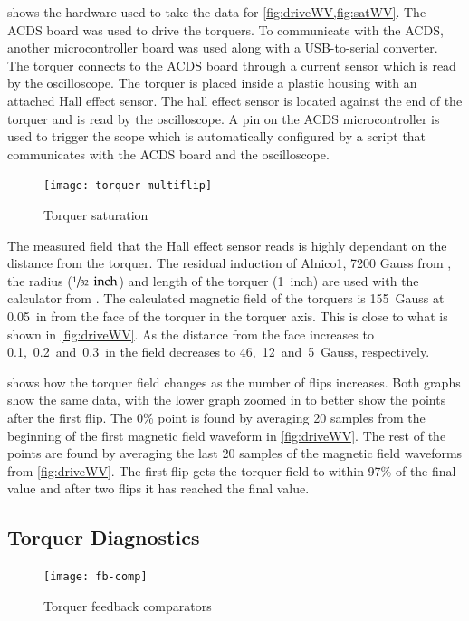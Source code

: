  shows the hardware used to take the data for \cref{fig:driveWV,fig:satWV}. The \ac{ACDS} board was used to drive the torquers. To communicate with the \ac{ACDS}, another microcontroller board was used along with a \ac{USB}-to-serial converter. The torquer connects to the \ac{ACDS} board through a current sensor which is read by the oscilloscope. The torquer is placed inside a plastic housing with an attached Hall effect sensor. The hall effect sensor is located against the end of the torquer and is read by the oscilloscope. A pin on the \ac{ACDS} microcontroller is  used to trigger the scope which is automatically configured by a \matlab script that communicates with the \ac{ACDS} board and the oscilloscope.

\begin{figure}[htb!]
    \centering
    \texttt{[image: torquer-multiflip]}
    \caption{Torquer saturation}
    \label{fig:satWV}
\end{figure}


The measured field that the Hall effect sensor reads is highly dependant on the distance from the torquer. The residual induction of Alnico1, 7200 Gauss from \cite{AlnicoProp}, the radius ($\sfrac{1}{32}~\, \mathrm{inch}$) and length of the torquer (1~inch) are used with the calculator from \cite{DexterField}. The calculated magnetic field of the torquers is 155~Gauss at 0.05~in from the face of the torquer in the torquer axis. This is close to what is shown in \cref{fig:driveWV}. As the distance from the face increases to 0.1,~0.2~and~0.3~in the field decreases to 46,~12~and~5~Gauss, respectively.

 shows how the torquer field changes as the number of flips increases. Both graphs show the same data, with the lower graph zoomed in to better show the points after the first flip. The 0\% point is found by averaging 20 samples from the beginning of the first magnetic field waveform in \cref{fig:driveWV}. The rest of the points are found by averaging the last 20 samples of the magnetic field waveforms from \cref{fig:driveWV}. The first flip gets the torquer field to within 97\% of the final value and after two flips it has reached the final value. 

\subsection{Torquer Diagnostics}

\begin{figure}[htb!]
    \centering
    \texttt{[image: fb-comp]}
    \caption{Torquer feedback comparators}
    \label{fig:fb-comp}
\end{figure}

